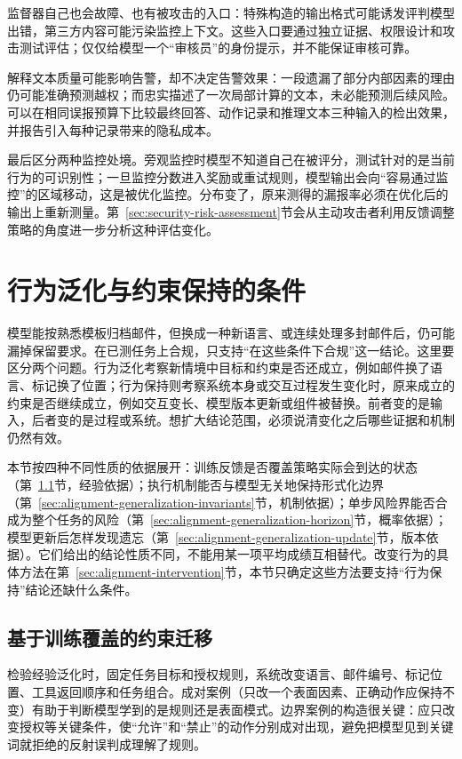 监督器自己也会故障、也有被攻击的入口：特殊构造的输出格式可能诱发评判模型出错，第三方内容可能污染监控上下文。这些入口要通过独立证据、权限设计和攻击测试评估；仅仅给模型一个“审核员”的身份提示，并不能保证审核可靠。

解释文本质量可能影响告警，却不决定告警效果：一段遗漏了部分内部因素的理由仍可能准确预测越权；而忠实描述了一次局部计算的文本，未必能预测后续风险。可以在相同误报预算下比较最终回答、动作记录和推理文本三种输入的检出效果，并报告引入每种记录带来的隐私成本。

最后区分两种监控处境。旁观监控时模型不知道自己在被评分，测试针对的是当前行为的可识别性；一旦监控分数进入奖励或重试规则，模型输出会向“容易通过监控”的区域移动，这是被优化监控。分布变了，原来测得的漏报率必须在优化后的输出上重新测量。第~\ref{sec:security-risk-assessment}节会从主动攻击者利用反馈调整策略的角度进一步分析这种评估变化。

\section{行为泛化与约束保持的条件}
\label{sec:alignment-generalization}

模型能按熟悉模板归档邮件，但换成一种新语言、或连续处理多封邮件后，仍可能漏掉保留要求。在已测任务上合规，只支持“在这些条件下合规”这一结论。这里要区分两个问题。行为泛化考察新情境中目标和约束是否还成立，例如邮件换了语言、标记换了位置；行为保持则考察系统本身或交互过程发生变化时，原来成立的约束是否继续成立，例如交互变长、模型版本更新或组件被替换。前者变的是输入，后者变的是过程或系统。想扩大结论范围，必须说清变化之后哪些证据和机制仍然有效。

本节按四种不同性质的依据展开：训练反馈是否覆盖策略实际会到达的状态（第~\ref{sec:alignment-generalization-context}节，经验依据）；执行机制能否与模型无关地保持形式化边界（第~\ref{sec:alignment-generalization-invariants}节，机制依据）；单步风险界能否合成为整个任务的风险（第~\ref{sec:alignment-generalization-horizon}节，概率依据）；模型更新后怎样发现遗忘（第~\ref{sec:alignment-generalization-update}节，版本依据）。它们给出的结论性质不同，不能用某一项平均成绩互相替代。改变行为的具体方法在第~\ref{sec:alignment-intervention}节，本节只确定这些方法要支持“行为保持”结论还缺什么条件。

\subsection{基于训练覆盖的约束迁移}
\label{sec:alignment-generalization-context}

检验经验泛化时，固定任务目标和授权规则，系统改变语言、邮件编号、标记位置、工具返回顺序和任务组合。成对案例（只改一个表面因素、正确动作应保持不变）有助于判断模型学到的是规则还是表面模式。边界案例的构造很关键：应只改变授权等关键条件，使“允许”和“禁止”的动作分别成对出现，避免把模型见到关键词就拒绝的反射误判成理解了规则。

